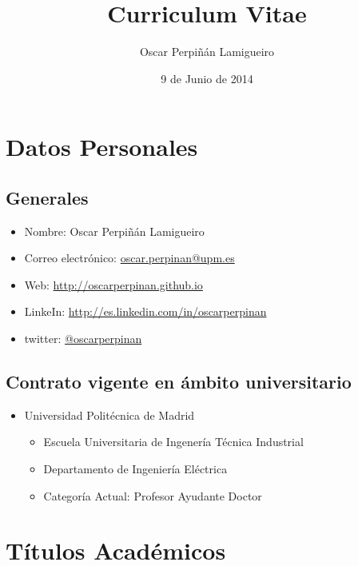 \documentclass[article, a4paper]{memoir}
\author{Oscar Perpiñán Lamigueiro}
\date{9 de Junio de 2014}
\title{Curriculum Vitae}
\begin{document}
\maketitle


\section{Datos Personales}
\label{sec-1}

\subsection{Generales}
\label{sec-1-1}

\begin{itemize}
\item Nombre: Oscar Perpiñán Lamigueiro
\item Correo electrónico: \href{mailto:oscar.perpinan@upm.es}{oscar.perpinan@upm.es}
\item Web: \url{http://oscarperpinan.github.io}
\item LinkeIn: \url{http://es.linkedin.com/in/oscarperpinan}
\item twitter: \href{https://twitter.com/oscarperpinan}{@oscarperpinan}
\end{itemize}

\subsection{Contrato vigente en ámbito universitario}
\label{sec-1-2}

\begin{itemize}
\item Universidad Politécnica de Madrid
\begin{itemize}
\item Escuela Universitaria de Ingenería Técnica Industrial
\item Departamento de Ingeniería Eléctrica
\item Categoría Actual: Profesor Ayudante Doctor
\end{itemize}
\end{itemize}

\section{Títulos Académicos}
\label{sec-2}
\end{document}
